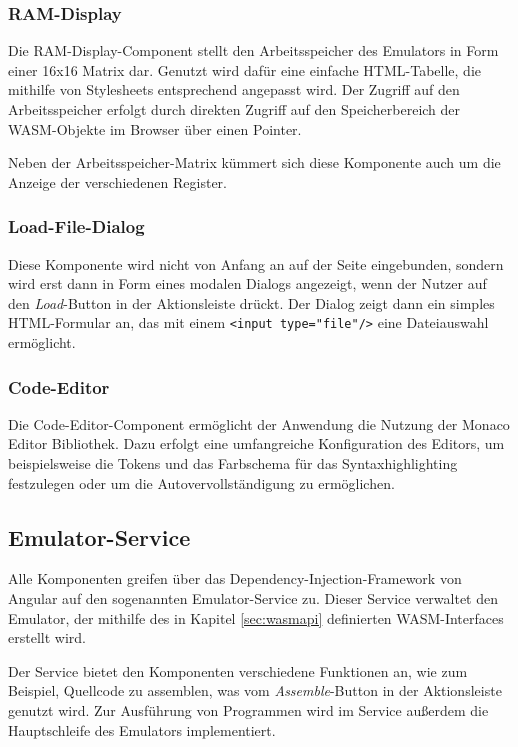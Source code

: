 \subsubsection{\ac{RAM}-Display}

Die \ac{RAM}-Display-Component stellt den Arbeitsspeicher des Emulators in Form einer 16x16 Matrix dar. Genutzt wird dafür eine einfache HTML-Tabelle, die mithilfe von Stylesheets entsprechend angepasst wird. Der Zugriff auf den Arbeitsspeicher erfolgt durch direkten Zugriff auf den Speicherbereich der \ac{WASM}-Objekte im Browser über einen Pointer.

Neben der Arbeitsspeicher-Matrix kümmert sich diese Komponente auch um die Anzeige der verschiedenen Register.

\subsubsection{Load-File-Dialog}

Diese Komponente wird nicht von Anfang an auf der Seite eingebunden, sondern wird erst dann in Form eines modalen Dialogs angezeigt, wenn der Nutzer auf den \textit{Load}-Button in der Aktionsleiste drückt. Der Dialog zeigt dann ein simples HTML-Formular an, das mit einem \texttt{<input type="file"/>} eine Dateiauswahl ermöglicht.

\subsubsection{Code-Editor}

Die Code-Editor-Component ermöglicht der Anwendung die Nutzung der Monaco Editor Bibliothek. Dazu erfolgt eine umfangreiche Konfiguration des Editors, um beispielsweise die Tokens und das Farbschema für das Syntaxhighlighting festzulegen oder um die Autovervollständigung zu ermöglichen.

\subsection{Emulator-Service}

Alle Komponenten greifen über das Dependency-Injection-Framework von Angular auf den sogenannten Emulator-Service zu. Dieser Service verwaltet den Emulator, der mithilfe des in Kapitel \ref{sec:wasmapi} definierten \ac{WASM}-Interfaces erstellt wird.

Der Service bietet den Komponenten verschiedene Funktionen an, wie zum Beispiel, Quellcode zu assemblen, was vom \textit{Assemble}-Button in der Aktionsleiste genutzt wird. Zur Ausführung von Programmen wird im Service außerdem die Hauptschleife des Emulators implementiert.

